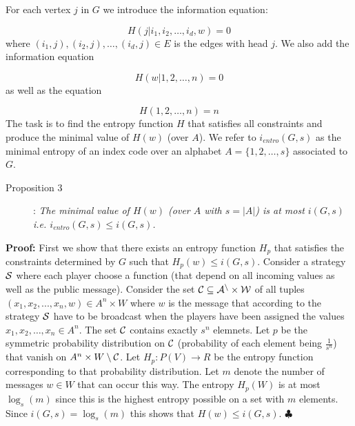 \documentclass[12pt]{article}
\begin{document}
For each vertex $j$ in $G$ we introduce the information equation: 

\begin{equation}
H(j | i_1,i_2,\ldots, i_d, w)=0 
\end{equation}
where 
$(i_1,j),(i_2,j),\ldots, (i_d,j) \in E$ is the edges with head $j$. We 
also add the information equation  

\begin{equation}
H(w | 1,2,\ldots,n)=0
\end{equation}
as well as the
equation 

\begin{equation}
H(1,2,\ldots,n)=n
\end{equation}
The task is to find the entropy function $H$
that satisfies all constraints and produce the minimal value of $H(w)$ (over $A$). We refer to 
$i_{entro}(G,s)$ as the minimal entropy of an index code over an alphabet $A=\{1,2,\ldots,s\}$ associated to $G$.

\begin{description}

\item[Proposition 3]:
{\it The minimal value of $H(w)$ (over $A$ with $s=|A|$) is at most $i(G,s)$ i.e. 
$i_{entro}(G,s) \leq i(G,s)$.}
\end{description}

\noindent
{\bf Proof:} First we show that there exists an entropy function $H_p$ 
that satisfies the constraints determined by $G$ such that 
$H_p(w) \leq i(G,s)$.  Consider a strategy $\cal{S}$ where each player 
choose a function (that depend on all incoming values as well as the public 
message).  
Consider the set $\cal{C} \subseteq A^n \times W$ of all tuples 
$(x_1,x_2,...,x_n, w) \in A^n \times W$ where $w$ is the message that 
according to the strategy 
$\cal{S}$ have to be broadcast when the players have been assigned the values 
$x_1,x_2, \ldots,x_n \in A^n$. The set $\cal{C}$ contains exactly $s^n$ elemnets. 
Let $p$ be the symmetric probability 
distribution on $\cal{C}$ 
(probability of each element being $\frac{1}{s^n}$) that vanish on 
$A^n \times W \setminus \cal{C}$. Let $H_p: P(V) \rightarrow R$ be the entropy 
function corresponding to that probability distribution.  Let $m$ denote the 
number of messages $w \in W$ that can occur this way. The entropy $H_p(W)$
is at most $\log_s(m)$ since this is the highest entropy possible on a set with $m$ elements.
Since $i(G,s)=\log_s(m)$ this shows that $H(w) \leq i(G,s)$.
\hfill $\clubsuit$
\end{document}

